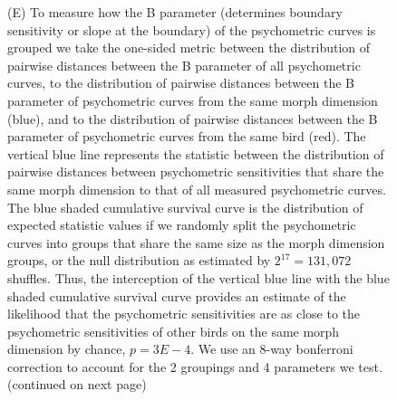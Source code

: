 \begin{figure}[tp]
{(E)	To measure how the B parameter (determines boundary sensitivity or slope at the boundary) of the psychometric curves is grouped we take the one-sided \KS metric between the distribution of pairwise distances between the B parameter of all psychometric curves, to the distribution of pairwise distances between the B parameter of psychometric curves from the same morph dimension (blue), and to the distribution of pairwise distances between the B parameter of psychometric curves from the same bird (red). The vertical blue line represents the \KS statistic between the distribution of pairwise distances between psychometric sensitivities that share the same morph dimension to that of all measured psychometric curves. The blue shaded cumulative survival curve is the distribution of expected \KS statistic values if we randomly split the psychometric curves into groups that share the same size as the morph dimension groups, or the null distribution as estimated by $2^{17}=131,072$ shuffles. Thus, the interception of the vertical blue line with the blue shaded cumulative survival curve provides an estimate of the likelihood that the psychometric sensitivities are as close to the psychometric sensitivities of other birds on the same morph dimension by chance, $p=3E-4$. We use an 8-way bonferroni correction to account for the 2 groupings and 4 parameters we test. (continued on next page)
}
\end{figure}

\begin{figure}[tp]
\end{figure}